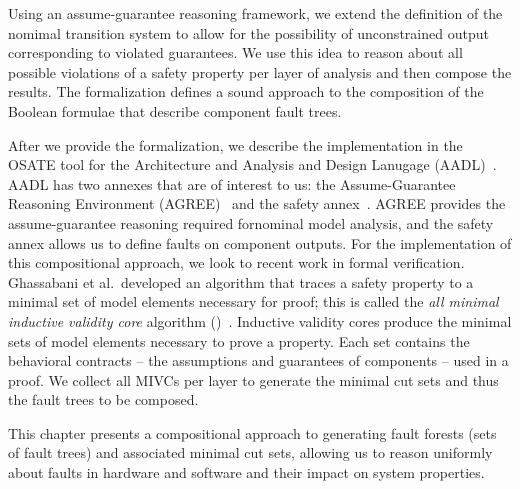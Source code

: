 Using an assume-guarantee reasoning framework, we extend the definition of the nomimal transition system to allow for the possibility of unconstrained output corresponding to violated guarantees. We use this idea to reason about all possible violations of a safety property per layer of analysis and then compose the results. The formalization defines a sound approach to the composition of the Boolean formulae that describe component fault trees.

After we provide the formalization, we describe the implementation in the OSATE tool for the Architecture and Analysis and Design Lanugage (AADL)~\cite{FeilerModelBasedEngineering2012}. AADL has two annexes that are of interest to us: the Assume-Guarantee Reasoning Environment (AGREE)~\cite{NFM2012:CoGaMiWhLaLu} and the safety annex~\cite{stewart2020safety}. AGREE provides the assume-guarantee reasoning required fornominal model analysis, and the safety annex allows us to define faults on component outputs. For the implementation of this compositional approach, we look to recent work in formal verification. Ghassabani et al.~developed an algorithm that traces a safety property to a minimal set of model elements necessary for proof; this is called the \textit{all minimal inductive validity core} algorithm (\aivcalg)~\cite{GhassabaniGW16,Ghassabani2017EfficientGO}. Inductive validity cores produce the minimal sets of model elements necessary to prove a property. Each set contains the behavioral contracts -- the assumptions and guarantees of components -- used in a proof. We collect all MIVCs per layer to generate the minimal cut sets and thus the fault trees to be composed.


This chapter presents a compositional approach to generating fault forests (sets of fault trees) and associated minimal cut sets, allowing us to reason uniformly about faults in hardware and software and their impact on system properties. 






